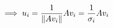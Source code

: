\documentclass[preview]{standalone}
\begin{document}
\begin{align*}
\special{dvisvgm:raw <g id='unique000'>}\implies u_i = \frac{1}{\|Av_i\|} Av_i \special{dvisvgm:raw </g>}\special{dvisvgm:raw <g id='unique001'>}= \frac{1}{\sigma_i} Av_i\special{dvisvgm:raw </g>}
\end{align*}
\end{document}
